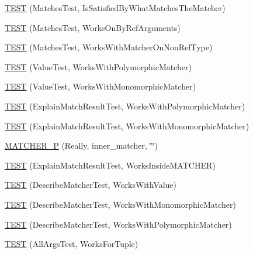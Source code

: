 \begin{DoxyCompactItemize}
\item 
\mbox{\hyperlink{namespacetesting_1_1gmock__matchers__test_a6617484cbb644af9882fc5d853112aae}{T\+E\+ST}} (Matches\+Test, Is\+Satisfied\+By\+What\+Matches\+The\+Matcher)
\item 
\mbox{\hyperlink{namespacetesting_1_1gmock__matchers__test_a6cfa391c9035262ccdc0d8f59e037b4d}{T\+E\+ST}} (Matches\+Test, Works\+On\+By\+Ref\+Arguments)
\item 
\mbox{\hyperlink{namespacetesting_1_1gmock__matchers__test_a9fd734ae5afb64a7285503bc0870c255}{T\+E\+ST}} (Matches\+Test, Works\+With\+Matcher\+On\+Non\+Ref\+Type)
\item 
\mbox{\hyperlink{namespacetesting_1_1gmock__matchers__test_a150118d4e990ba9fb9978329e742c931}{T\+E\+ST}} (Value\+Test, Works\+With\+Polymorphic\+Matcher)
\item 
\mbox{\hyperlink{namespacetesting_1_1gmock__matchers__test_a53403682e9ffc12152b0b1c7f55dfa12}{T\+E\+ST}} (Value\+Test, Works\+With\+Monomorphic\+Matcher)
\item 
\mbox{\hyperlink{namespacetesting_1_1gmock__matchers__test_a985e2bc1546b67de764d759de111e8e9}{T\+E\+ST}} (Explain\+Match\+Result\+Test, Works\+With\+Polymorphic\+Matcher)
\item 
\mbox{\hyperlink{namespacetesting_1_1gmock__matchers__test_aeff2711a03b27a66c1c98ed97ff49b09}{T\+E\+ST}} (Explain\+Match\+Result\+Test, Works\+With\+Monomorphic\+Matcher)
\item 
\mbox{\hyperlink{namespacetesting_1_1gmock__matchers__test_ab4f04d3b75ca92e4f5fd711b9f2a514a}{M\+A\+T\+C\+H\+E\+R\+\_\+P}} (Really, inner\+\_\+matcher, \char`\"{}\char`\"{})
\item 
\mbox{\hyperlink{namespacetesting_1_1gmock__matchers__test_ae57edef8890da6b929dd0d21c2f7c071}{T\+E\+ST}} (Explain\+Match\+Result\+Test, Works\+Inside\+M\+A\+T\+C\+H\+ER)
\item 
\mbox{\hyperlink{namespacetesting_1_1gmock__matchers__test_a2777633a1fadcdb5b6ad1a8ee78a8b54}{T\+E\+ST}} (Describe\+Matcher\+Test, Works\+With\+Value)
\item 
\mbox{\hyperlink{namespacetesting_1_1gmock__matchers__test_a3874504a484739f047b6e3c295b5764a}{T\+E\+ST}} (Describe\+Matcher\+Test, Works\+With\+Monomorphic\+Matcher)
\item 
\mbox{\hyperlink{namespacetesting_1_1gmock__matchers__test_a6232037654e87ad5ddd4a21abd73a5a4}{T\+E\+ST}} (Describe\+Matcher\+Test, Works\+With\+Polymorphic\+Matcher)
\item 
\mbox{\hyperlink{namespacetesting_1_1gmock__matchers__test_aeea300647af4c7611f4e491cabcbf950}{T\+E\+ST}} (All\+Args\+Test, Works\+For\+Tuple)

\end{DoxyCompactItemize}
